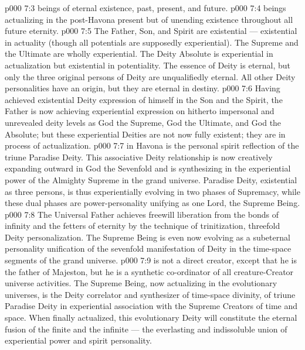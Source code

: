 \vs p000 7:3 \bibnobreakspace {} beings of eternal existence, past, present, and future.
\vs p000 7:4 \bibnobreakspace {} beings actualizing in the post\hyp{}Havona present but of unending existence throughout all future eternity.
\vs p000 7:5 \pc The Father, Son, and Spirit are existential --- existential in actuality (though all potentials are supposedly experiential). The Supreme and the Ultimate are wholly experiential. The Deity Absolute is experiential in actualization but existential in potentiality. The essence of Deity is eternal, but only the three original persons of Deity are unqualifiedly eternal. All other Deity personalities have an origin, but they are eternal in destiny.
\vs p000 7:6 Having achieved existential Deity expression of himself in the Son and the Spirit, the Father is now achieving experiential expression on hitherto impersonal and unrevealed deity levels as God the Supreme, God the Ultimate, and God the Absolute; but these experiential Deities are not now fully existent; they are in process of actualization.
\vs p000 7:7 \pc {} in Havona is the personal spirit reflection of the triune Paradise Deity. This associative Deity relationship is now creatively expanding outward in God the Sevenfold and is synthesizing in the experiential power of the Almighty Supreme in the grand universe. Paradise Deity, existential as three persons, is thus experientially evolving in two phases of Supremacy, while these dual phases are power\hyp{}personality unifying as one Lord, the Supreme Being.
\vs p000 7:8 The Universal Father achieves freewill liberation from the bonds of infinity and the fetters of eternity by the technique of trinitization, threefold Deity personalization. The Supreme Being is even now evolving as a subeternal personality unification of the sevenfold manifestation of Deity in the time\hyp{}space segments of the grand universe.
\vs p000 7:9 \pc {} is not a direct creator, except that he is the father of Majeston, but he is a synthetic co\hyp{}ordinator of all creature\hyp{}Creator universe activities. The Supreme Being, now actualizing in the evolutionary universes, is the Deity correlator and synthesizer of time\hyp{}space divinity, of triune Paradise Deity in experiential association with the Supreme Creators of time and space. When finally actualized, this evolutionary Deity will constitute the eternal fusion of the finite and the infinite --- the everlasting and indissoluble union of experiential power and spirit personality.

